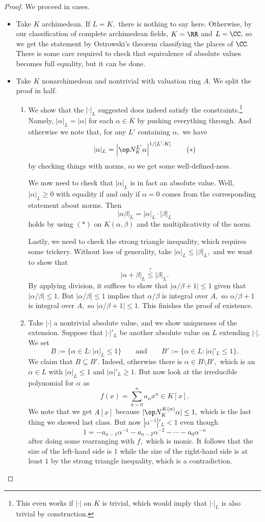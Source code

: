 \begin{proof}
	We proceed in cases.
	\begin{itemize}
		\item Take $K$ archimedean. If $L=K,$ there is nothing to say here. Otherwise, by our classification of complete archimedean fields, $K=\RR$ and $L=\CC,$ so we get the statement by Ostrowski's theorem classifying the places of $\CC.$ There is some care required to check that equivalence of absolute values becomes full equality, but it can be done.
		\item Take $K$ nonarchimedean and nontrivial with valuation ring $A.$ We split the proof in half.
		\begin{enumerate}[label=(\alph*)]
			\item We show that the $|\cdot|_L$ suggested does indeed satisfy the constraints.\footnote{This even works if $|\cdot|$ on $K$ is trivial, which would imply that $|\cdot|_L$ is also trivial by construction.} Namely, $|\alpha|_L=|\alpha|$ for each $\alpha\in K$ by pushing everything through. And otherwise we note that, for any $L'$ containing $\alpha,$ we have
			\[|\alpha|_L=\left|\op N^{L'}_K\alpha\right|^{1/[L':K]}\tag{$*$}\]
			by checking things with norms, so we get some well-defined-ness.

			We now need to check that $|\alpha|_L$ is in fact an absolute value. Well, $|\alpha|_L\ge0$ with equality if and only if $\alpha=0$ comes from the corresponding statement about norms. Then
			\[|\alpha\beta|_L=|\alpha|_L\cdot|\beta|_L\]
			holds by using $(*)$ on $K(\alpha,\beta)$ and the multiplicativity of the norm.

			Lastly, we need to check the strong triangle inequality, which requires some trickery. Without loss of generality, take $|\alpha|_L\le|\beta|_L,$ and we want to show that
			\[|\alpha+\beta|_L\stackrel?\le|\beta|_L.\]
			By applying division, it suffices to show that $|\alpha/\beta+1|\le1$ given that $|\alpha/\beta|\le1.$ But $|\alpha/\beta|\le1$ implies that $\alpha/\beta$ is integral over $A,$ so $\alpha/\beta+1$ is integral over $A,$ so $|\alpha/\beta+1|\le1.$ This finishes the proof of existence.

			\item Take $|\cdot|$ a nontrivial absolute value, and we show uniqueness of the extension. Suppose that $|\cdot|'_L$ be another absolute value on $L$ extending $|\cdot|.$ We set
			\[B:=\{\alpha\in L:|\alpha|_L\le1\}\qquad\text{and}\qquad B':=\{\alpha\in L:|\alpha|'_L\le1\}.\]
			We claim that $B\subseteq B'.$ Indeed, otherwise there is $\alpha\in B\setminus B',$ which is an $\alpha\in L$ with $|\alpha|_L\le1$ and $|\alpha|'_L\ge1.$ But now look at the irreducible polynomial for $\alpha$ as
			\[f(x)=\sum_{k=0}^na_nx^n\in K[x].\]
			We note that we get $A[x]$ because $|\op N_K^{K(\alpha)}\alpha|\le1,$ which is the last thing we showed last class. But now $|\alpha^{-1}|'_L<1$ even though
			\[1=-a_{n-1}\alpha^{-1}-a_{n-2}\alpha^{-2}-\cdots-a_0\alpha^{-n}\]
			after doing some rearranging with $f,$ which is monic. It follows that the size of the left-hand side is $1$ while the size of the right-hand side is at least $1$ by the strong triangle inequality, which is a contradiction.


\end{enumerate}
\end{itemize}
\end{proof}
